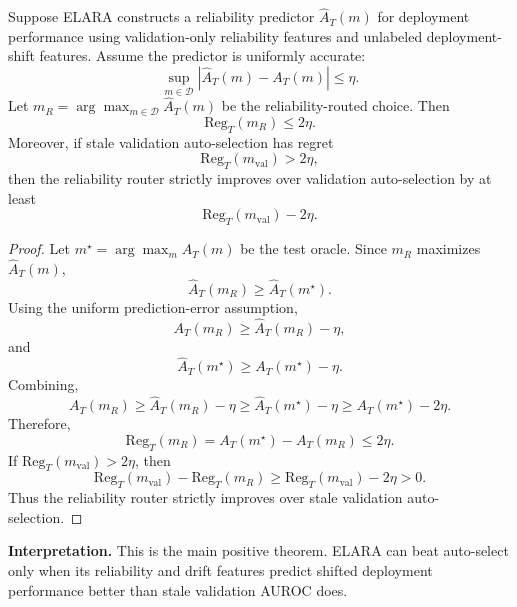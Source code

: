 \begin{theorem}
\label{thm:reliability_separation}
Suppose ELARA constructs a reliability predictor $\widehat{A}_T(m)$ for deployment performance using validation-only reliability features and unlabeled deployment-shift features. Assume the predictor is uniformly accurate:
\[
\sup_{m\in\mathcal{D}} |\widehat{A}_T(m)-A_T(m)| \leq \eta.
\]
Let $m_R=\arg\max_{m\in\mathcal{D}}\widehat{A}_T(m)$ be the reliability-routed choice. Then
\[
\mathrm{Reg}_T(m_R)\leq 2\eta.
\]
Moreover, if stale validation auto-selection has regret
\[
\mathrm{Reg}_T(m_{\mathrm{val}}) > 2\eta,
\]
then the reliability router strictly improves over validation auto-selection by at least
\[
\mathrm{Reg}_T(m_{\mathrm{val}})-2\eta.
\]
\end{theorem}
\begin{proof}
Let $m^\star=\arg\max_m A_T(m)$ be the test oracle. Since $m_R$ maximizes $\widehat{A}_T(m)$,
\[
\widehat{A}_T(m_R)\geq \widehat{A}_T(m^\star).
\]
Using the uniform prediction-error assumption,
\[
A_T(m_R)\geq \widehat{A}_T(m_R)-\eta,
\]
and
\[
\widehat{A}_T(m^\star)\geq A_T(m^\star)-\eta.
\]
Combining,
\[
A_T(m_R)
\geq \widehat{A}_T(m_R)-\eta
\geq \widehat{A}_T(m^\star)-\eta
\geq A_T(m^\star)-2\eta.
\]
Therefore,
\[
\mathrm{Reg}_T(m_R) = A_T(m^\star)-A_T(m_R) \leq 2\eta.
\]
If $\mathrm{Reg}_T(m_{\mathrm{val}})>2\eta$, then
\[
\mathrm{Reg}_T(m_{\mathrm{val}})-\mathrm{Reg}_T(m_R) \geq \mathrm{Reg}_T(m_{\mathrm{val}})-2\eta > 0.
\]
Thus the reliability router strictly improves over stale validation auto-selection.
\end{proof}

\medskip
\noindent\textbf{Interpretation.}
This is the main positive theorem. ELARA can beat auto-select only when its reliability and drift features predict shifted deployment performance better than stale validation AUROC does.

